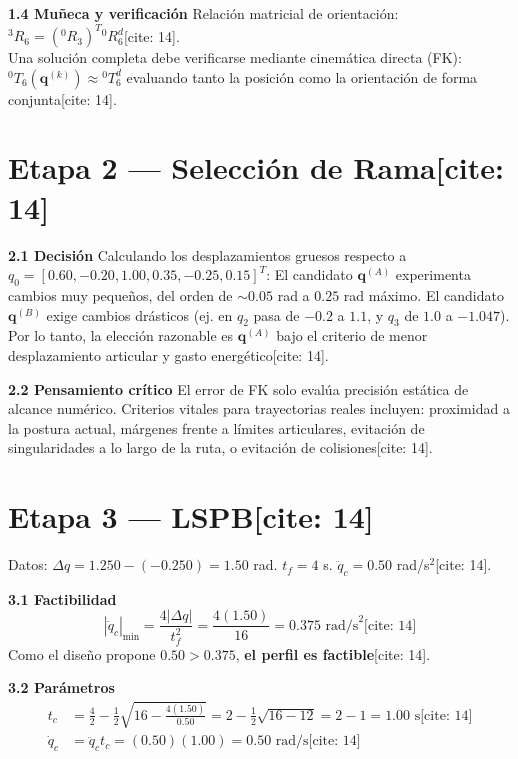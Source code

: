\documentclass[11pt, a4paper]{article}
\begin{document}
\textbf{1.4 Muñeca y verificación}
Relación matricial de orientación: $\boxed{ {}^3R_6 = ({}^0R_3)^T {}^0R_6^d }$[cite: 14]. \\
Una solución completa debe verificarse mediante cinemática directa (FK): $\boxed{ {}^0T_6(\mathbf{q}^{(k)}) \approx {}^0T_6^d }$ evaluando tanto la posición como la orientación de forma conjunta[cite: 14].

\section*{Etapa 2 — Selección de Rama[cite: 14]}

\textbf{2.1 Decisión}
Calculando los desplazamientos gruesos respecto a $q_0 = [0.60, -0.20, 1.00, 0.35, -0.25, 0.15]^T$:
El candidato $\mathbf{q}^{(A)}$ experimenta cambios muy pequeños, del orden de $\sim 0.05$ rad a $0.25$ rad máximo. El candidato $\mathbf{q}^{(B)}$ exige cambios drásticos (ej. en $q_2$ pasa de $-0.2$ a $1.1$, y $q_3$ de $1.0$ a $-1.047$). Por lo tanto, la elección razonable es $\boxed{ \mathbf{q}^{(A)} }$ bajo el criterio de menor desplazamiento articular y gasto energético[cite: 14].

\textbf{2.2 Pensamiento crítico}
El error de FK solo evalúa precisión estática de alcance numérico. Criterios vitales para trayectorias reales incluyen: proximidad a la postura actual, márgenes frente a límites articulares, evitación de singularidades a lo largo de la ruta, o evitación de colisiones[cite: 14].

\section*{Etapa 3 — LSPB[cite: 14]}

Datos: $\Delta q = 1.250 - (-0.250) = 1.50$ rad. $t_f = 4$ s. $\ddot{q}_c = 0.50$ rad/s$^2$[cite: 14].

\textbf{3.1 Factibilidad}
\begin{equation*}
    |\ddot{q}_c|_{\min} = \frac{4|\Delta q|}{t_f^2} = \frac{4(1.50)}{16} = \boxed{ 0.375 \text{ rad/s}^2 } \text{[cite: 14]}
\end{equation*}
Como el diseño propone $0.50 > 0.375$, \textbf{el perfil es factible}[cite: 14].

\textbf{3.2 Parámetros}
\begin{align*}
    t_c &= \frac{4}{2} - \frac{1}{2}\sqrt{ 16 - \frac{4(1.50)}{0.50} } = 2 - \frac{1}{2}\sqrt{16 - 12} = 2 - 1 = \boxed{ 1.00 \text{ s} } \text{[cite: 14]} \\
    \dot{q}_c &= \ddot{q}_c t_c = (0.50)(1.00) = \boxed{ 0.50 \text{ rad/s} } \text{[cite: 14]}
\end{align*}
\end{document}
